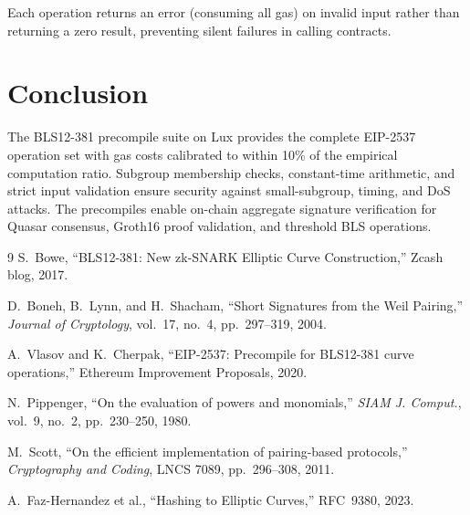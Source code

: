 \documentclass[11pt,a4paper]{article}
\begin{document}
Each operation returns an error (consuming all gas) on invalid input rather than
returning a zero result, preventing silent failures in calling contracts.

\section{Conclusion}

The BLS12-381 precompile suite on Lux provides the complete EIP-2537 operation set
with gas costs calibrated to within 10\% of the empirical computation ratio. Subgroup
membership checks, constant-time arithmetic, and strict input validation ensure
security against small-subgroup, timing, and DoS attacks. The precompiles enable
on-chain aggregate signature verification for Quasar consensus, Groth16 proof
validation, and threshold BLS operations.

\begin{thebibliography}{9}
  S.~Bowe, ``BLS12-381: New zk-SNARK Elliptic Curve Construction,''
  Zcash blog, 2017.

  D.~Boneh, B.~Lynn, and H.~Shacham, ``Short Signatures from the Weil Pairing,''
  \textit{Journal of Cryptology}, vol.~17, no.~4, pp.~297--319, 2004.

  A.~Vlasov and K.~Cherpak, ``EIP-2537: Precompile for BLS12-381 curve operations,''
  Ethereum Improvement Proposals, 2020.

  N.~Pippenger, ``On the evaluation of powers and monomials,''
  \textit{SIAM J. Comput.}, vol.~9, no.~2, pp.~230--250, 1980.

  M.~Scott, ``On the efficient implementation of pairing-based protocols,''
  \textit{Cryptography and Coding}, LNCS 7089, pp.~296--308, 2011.

  A.~Faz-Hernandez et al., ``Hashing to Elliptic Curves,'' RFC~9380, 2023.
\end{thebibliography}
\end{document}
